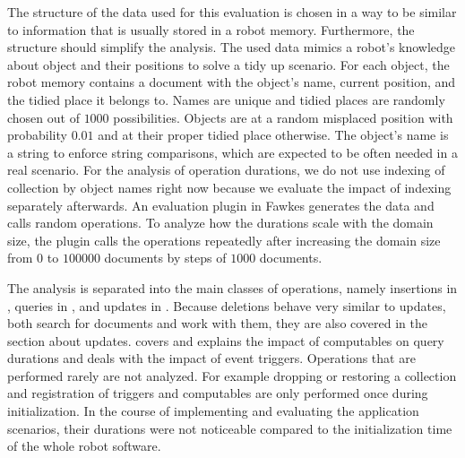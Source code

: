 The structure of the data used for this evaluation is chosen in a way
to be similar to information that is usually stored in a robot
memory. Furthermore, the structure should simplify the analysis. The used data mimics
a robot's knowledge about object and their positions to solve a tidy
up scenario. For each object, the robot memory contains a document
with the object's name, current position, and the tidied place it
belongs to. Names are unique and tidied places are randomly chosen
out of $1000$ possibilities. Objects are at a random misplaced position with
probability $0.01$ and at their proper tidied place otherwise. The
object's name is a string to enforce string comparisons, which are
expected to be often needed in a real scenario. For the analysis of
operation durations, we do not use indexing of collection by object names right now
because we evaluate the impact of indexing separately afterwards.
An evaluation plugin in
Fawkes generates the data and calls random operations. To analyze how
the durations scale with the domain size, the plugin calls the
operations repeatedly after increasing the domain size from $0$ to
$100000$ documents by steps of $1000$ documents.

The analysis is separated into the main classes of operations, namely
insertions in , queries in
, and updates in . Because
deletions behave very similar to updates, both search for documents
and work with them, they are also covered in the section about
updates.  covers and explains the impact
of computables on query durations and  deals
with the impact of event triggers. Operations that are performed
rarely are not analyzed. For example dropping or restoring a collection and
registration of triggers and computables are only performed once
during initialization.  In the course of implementing and evaluating
the application scenarios, their durations were not noticeable compared
to the initialization time of the whole robot software.


